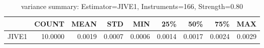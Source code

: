 \begin{table}[ht]
\centering
\caption{variance summary: Estimator=JIVE1, Instruments=166, Strength=0.80}
\begin{tabular}{lrrrrrrrr}
\toprule
 & COUNT & MEAN & STD & MIN & 25\% & 50\% & 75\% & MAX \\
\midrule
JIVE1 & 10.0000 & 0.0019 & 0.0007 & 0.0006 & 0.0014 & 0.0017 & 0.0024 & 0.0029 \\
\bottomrule
\end{tabular}
\end{table}
